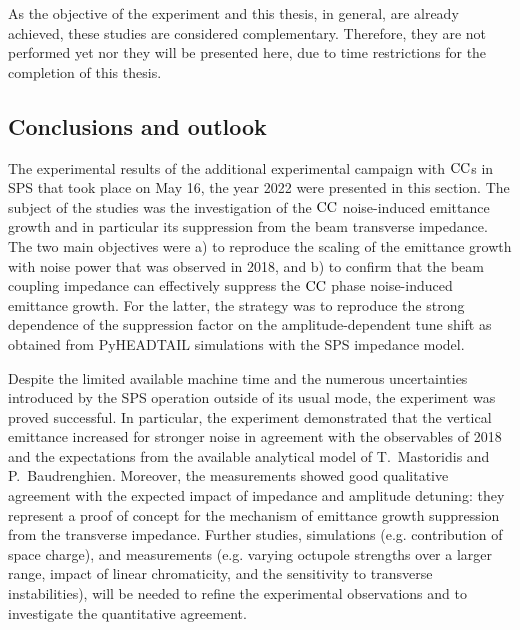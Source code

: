 As the objective of the experiment and this thesis, in general, are already achieved, these studies are considered complementary. Therefore, they are not performed yet nor they will be presented here, due to time restrictions for the completion of this thesis. 

\subsection{Conclusions and outlook}\label{subsec:conlusions_ch8_cc_md}
The experimental results of the additional experimental campaign with ${\mathrm{CC}}$s in SPS that took place on May 16, the year 2022 were presented in this section. The subject of the studies was the investigation of the ${\mathrm{CC}}$ noise-induced emittance growth and in particular its suppression from the beam transverse impedance. The two main objectives were a) to reproduce the scaling of the emittance growth with noise power that was observed in 2018, and b) to confirm that the beam coupling impedance can effectively suppress the ${\mathrm{CC}}$ phase noise-induced emittance growth. For the latter, the strategy was to reproduce the strong dependence of the suppression factor on the amplitude-dependent tune shift as obtained from PyHEADTAIL simulations with the SPS impedance model.

Despite the limited available machine time and the numerous uncertainties introduced by the SPS operation outside of its usual mode, the experiment was proved successful. In particular, the experiment demonstrated that the vertical emittance increased for stronger noise in agreement with the observables of 2018 and the expectations from the available analytical model of T.~Mastoridis and P.~Baudrenghien. Moreover, the measurements showed good qualitative agreement with the expected impact of impedance and amplitude detuning: they represent a proof of concept for the mechanism of emittance growth suppression from the transverse impedance. Further studies, simulations (e.g. contribution of space charge), and measurements (e.g. varying octupole strengths over a larger range, impact of linear chromaticity, and the sensitivity to transverse instabilities), will be needed to refine the experimental observations and to investigate the quantitative agreement. 




